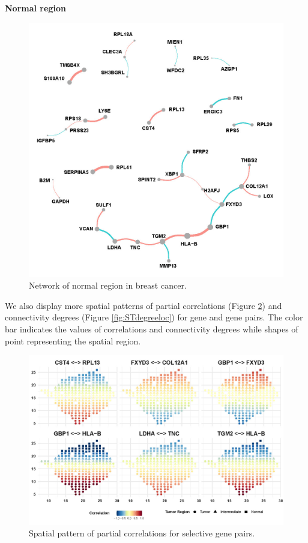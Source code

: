 \documentclass[
]{book}
\begin{document}
\textbf{Normal region}

\begin{figure}

{\centering \includegraphics[width=0.7\linewidth]{images/location_c1_full} 

}

\caption{Network of normal region in breast cancer.}\label{fig:STnormalnet}
\end{figure}

We also display more spatial patterns of partial correlations (Figure \ref{fig:STcorloc}) and connectivity degrees (Figure \ref{fig:STdegreeloc}) for gene and gene pairs. The color bar indicates the values of correlations and connectivity degrees while shapes of point representing the spatial region.

\begin{figure}

{\centering \includegraphics[width=0.7\linewidth]{images/supp_corr} 

}

\caption{Spatial pattern of partial correlations for selective gene pairs.}\label{fig:STcorloc}
\end{figure}
\end{document}
